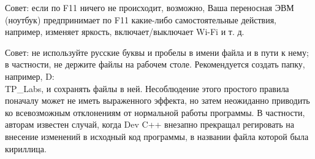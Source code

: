 Совет: если по F11 ничего не происходит, возможно, Ваша переносная ЭВМ (ноутбук) предпринимает по F11 какие-либо самостоятельные действия, например, изменяет яркость, включает/выключает Wi-Fi и т. д.


Совет: не используйте русские буквы и пробелы в имени файла и в пути к нему; в частности, не держите файлы на рабочем столе.
Рекомендуется создать папку, например, D:\\TP_Labs, и сохранять файлы в ней.
Несоблюдение этого простого правила поначалу может не иметь выраженного эффекта, но затем неожиданно приводить ко всевозможным отклонениям от нормальной работы программы.
В частности, авторам известен случай, когда Dev C++ внезапно прекращал регировать на внесение изменений в исходный код программы, в названии файла которой была кириллица.
